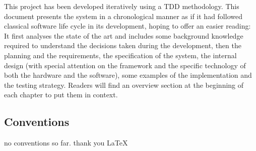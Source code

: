 This project has been developed iteratively using a \ac{TDD} methodology. 
This document presents the system in a chronological manner as if it had followed classical software life cycle in its development, hoping to offer an easier reading:
It first analyses the state of the art and includes some background knowledge required to understand the decisions taken during the development, then the planning and the requirements, the specification of the system, the internal design (with special attention on the framework and the specific technology of both the hardware and the software), some examples of the implementation and the testing strategy.
Readers will find an overview section at the beginning of each chapter to put them in context.

\subsection{Conventions}
no conventions so far. thank you \LaTeX

